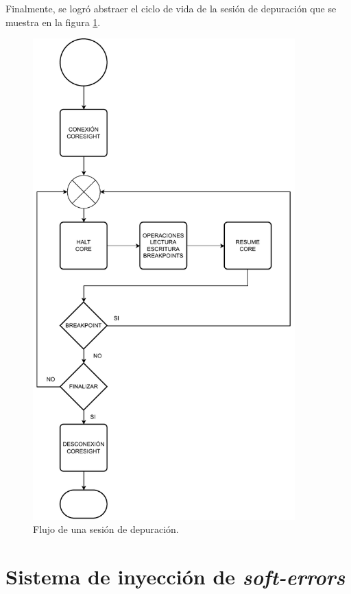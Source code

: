 Finalmente, se logró abstraer el ciclo de vida de la sesión de depuración que se muestra en la figura \ref{fig:debugsession}.

\begin{figure}[htbp]
	\centering
	\includegraphics[width=0.9\textwidth]{./Figures/debugsession.pdf}
    \caption{Flujo de una sesión de depuración.}
	\label{fig:debugsession}
\end{figure}

\section{Sistema de inyección de \emph{soft-errors}}
\label{sec:sise}

